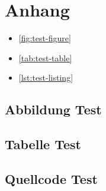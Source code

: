 \thispagestyle{plain}

\section{Anhang}\label{apdx}

\lipsum[1]

\begin{itemize}
    \item \autoref{fig:test-figure}
    \item \autoref{tab:test-table}
    \item \autoref{lst:test-listing}
\end{itemize}

\subsection{Abbildung Test}\label{apdx:figures}


\clearpage

\subsection{Tabelle Test}\label{apdx:tables}


\clearpage

\subsection{Quellcode Test}\label{apdx:listings}


\clearpage